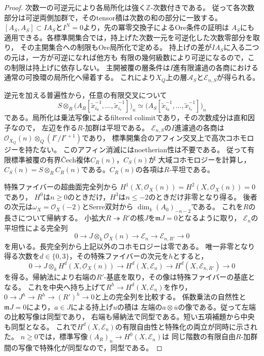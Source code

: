 \begin{proof}
次数一の可逆元により各局所化は強く$\mathbb Z$-次数付きである。
従って各次数部分は可逆両側加群で，そのtensor積は次数の和の部分に一致する。
$[A_S,A_S]\subset IA_S$と$I^N=0$より，先の冪零交換子によるOre条件の証明は
$A_S$にも適用できる。各標準開集合では，持上げた次数一元を可逆化した次数零部分を取り，
その主開集合への制限もOre局所化で定める。
持上げの差が$IA_S$に入る二つの元は，一方が可逆になれば他方も
有限の幾何級数により可逆になるので，この制限は持上げに依存しない。
主開被覆の層条件は$I$進有限濾過の各商における通常の可換環の局所化へ帰着する。
これにより$X_Q$上の層$\mathscr A_S$と$\mathscr E_{n,S}$が得られる。

逆元を加える普遍性から，任意の有限交叉について
\[
 S\otimes_R\bigl(A_R[\widetilde x_{i_0}^{-1},\ldots,
                      \widetilde x_{i_r}^{-1}]\bigr)_n
 \simeq\bigl(A_S[\widetilde x_{i_0}^{-1},\ldots,
                    \widetilde x_{i_r}^{-1}]\bigr)_n
\]
である。局所化は乗法写像によるfiltered colimitであり，その次数成分は直和因子なので，
左辺を作る$R$-加群は平坦である。
$\mathscr E_{n,S}$の$I$進濾過の各商は
$\mathcal O_{X_Q}(n)\otimes_Q(I^r/I^{r+1})$であり，
標準開集合のアフィン交叉上で高次コホモロジーを持たない。
このアフィン消滅にはnoetherian性は不要である。
従って有限標準被覆の有界\v{C}ech複体$C_R(n)$，$C_S(n)$が
大域コホモロジーを計算し，
$C_S(n)=S\otimes_RC_R(n)$である。$C_R(n)$の各項は$R$-平坦である。

特殊ファイバーの超曲面完全列から
$H^1(X,\mathcal O_X(n))=H^2(X,\mathcal O_X(n))=0$であり，
$H^0$は$n\ge0$のときだけ，$H^3$は$n\le-2$のときだけ非零となり得る。
後者の次元は$\omega_X=\mathcal O_X(-2)$とSerre双対から
$\dim_k(A_0)_{-n-2}$である。
これを$R$の長さについて帰納する。
小拡大$R\twoheadrightarrow R'$の核$J$を$\mathfrak mJ=0$となるように取り，
$\mathscr E_n$の平坦性による完全列
\[
 0\longrightarrow J\otimes_k\mathcal O_X(n)
 \longrightarrow\mathscr E_n
 \longrightarrow\mathscr E_{n,R'}\longrightarrow0
\]
を用いる。長完全列から上記以外のコホモロジーは零である。
唯一非零となり得る次数を$d\in\{0,3\}$，その特殊ファイバーの次元を$h$とすると，
\[
 0\longrightarrow J\otimes_kH^d(X,\mathcal O_X(n))
 \longrightarrow H^d(X,\mathscr E_n)
 \longrightarrow H^d(X,\mathscr E_{n,R'})\longrightarrow0
\]
を得る。帰納法により右端の$R'$-基底を取り，その像は特殊ファイバーの基底となる。
これを中央へ持ち上げて$R^h\to H^d(X,\mathscr E_n)$を作り，
$0\to J^h\to R^h\to(R')^h\to0$と上の完全列を比較する。
係数乗法の自然性と$\mathfrak mJ=0$により，$a\in J$による持上げ$u$の積は
左端の$a\otimes\overline u$の像である。従って左端の比較写像は同型であり，
右端も帰納法で同型である。短い五項補題から中央も同型となる。
これで$H^d(X,\mathscr E_n)$の有限自由性と特殊化の両立が同時に示された。
$n\ge0$では，標準写像$(A_R)_n\to H^0(X,\mathscr E_n)$は
同じ階数の有限自由$R$-加群間の写像で特殊化が同型なので，同型である。


\end{proof}
